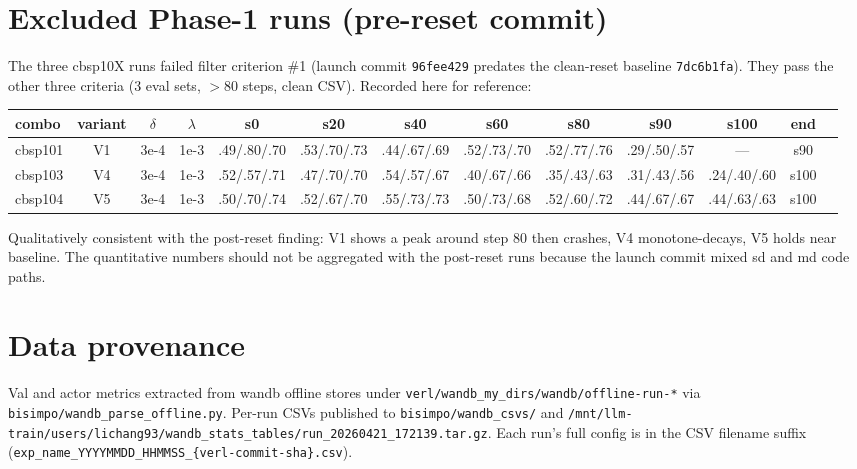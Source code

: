 \documentclass[10pt]{article}
\begin{document}
\appendix
\section{Excluded Phase-1 runs (pre-reset commit)}

The three cbsp10X runs failed filter criterion \#1 (launch commit
\texttt{96fee429} predates the clean-reset baseline
\texttt{7dc6b1fa}). They pass the other three criteria (3 eval sets,
$>80$ steps, clean CSV). Recorded here for reference:

\begin{center}
\scriptsize
\setlength{\tabcolsep}{3pt}
\begin{tabular}{l|cccccccccccc}
\toprule
combo   & variant & $\delta$ & $\lambda$ & s0 & s20 & s40 & s60 & s80 & s90 & s100 & end \\
\midrule
cbsp101 & V1      & 3e-4     & 1e-3      & .49/.80/.70 & .53/.70/.73 & .44/.67/.69 & .52/.73/.70 & .52/.77/.76 & .29/.50/.57 & --- & s90 \\
cbsp103 & V4      & 3e-4     & 1e-3      & .52/.57/.71 & .47/.70/.70 & .54/.57/.67 & .40/.67/.66 & .35/.43/.63 & .31/.43/.56 & .24/.40/.60 & s100 \\
cbsp104 & V5      & 3e-4     & 1e-3      & .50/.70/.74 & .52/.67/.70 & .55/.73/.73 & .50/.73/.68 & .52/.60/.72 & .44/.67/.67 & .44/.63/.63 & s100 \\
\bottomrule
\end{tabular}
\end{center}

\noindent Qualitatively consistent with the post-reset finding: V1
shows a peak around step 80 then crashes, V4 monotone-decays, V5
holds near baseline. The quantitative numbers should not be
aggregated with the post-reset runs because the launch commit mixed
sd and md code paths.

\section{Data provenance}

Val and actor metrics extracted from wandb offline stores under
\texttt{verl/wandb\_my\_dirs/wandb/offline-run-*} via
\texttt{bisimpo/wandb\_parse\_offline.py}. Per-run CSVs published to
\texttt{bisimpo/wandb\_csvs/} and
\texttt{/mnt/llm-train/users/lichang93/wandb\_stats\_tables/\-run\_20260421\_172139.tar.gz}.
Each run's full config is in the CSV filename suffix
(\texttt{exp\_name\_YYYYMMDD\_HHMMSS\_\{verl-commit-sha\}.csv}).
\end{document}
